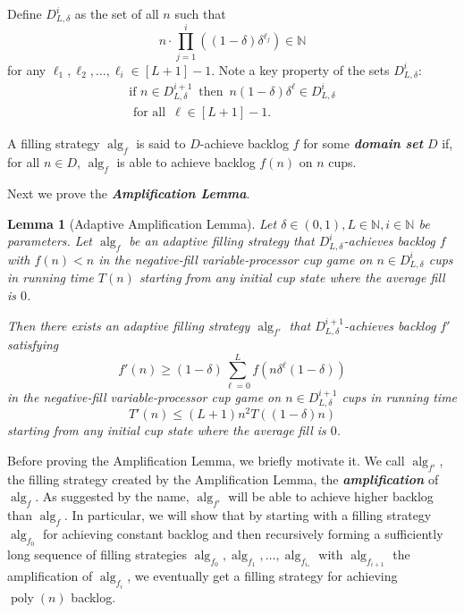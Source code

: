 \documentclass[twocolumn]{article}[10pt]
\newcommand{\defn}[1]{{\textit{\textbf{\boldmath #1}}}\xspace}
\DeclareMathOperator{\poly}{\text{poly}}
\DeclareMathOperator{\alg}{\text{alg}}
\newtheorem{lemma}{Lemma}
\begin{document}
Define $D_{L, \delta}^i$ as the set of all
$n$ such that 
$$n\cdot \prod_{j=1}^i \left((1-\delta)\delta^{\ell_j}\right)
\in \mathbb{N}$$ 
for any $\ell_1,\ell_2, \ldots, \ell_i \in [L+1]-1$.
Note a key property of the sets $D_{L, \delta}^i$: 
\begin{align}
  \text{if }n \in D_{L, \delta}^{i+1}\, \text{ then } \,
  n(1-\delta)\delta^\ell \in D_{L, \delta}^i
  \label{eqn:deltaIplus1toI}\\
  \text{ for all }\, \ell \in [L+1]-1 \nonumber.
\end{align}

A filling strategy $\alg_f$ is said to $D$-achieve backlog
$f$ for some \defn{domain set} $D$ if, for all $n \in D$,
$\alg_f$ is able to achieve backlog $f(n)$ on $n$ cups.

Next we prove the \defn{Amplification Lemma}.
\begin{lemma}[Adaptive Amplification Lemma]\label{lem:adaptiveAmplification}
  Let $\delta\in(0,1), L\in \mathbb{N}, i\in\mathbb{N}$ be parameters.
  Let $\alg_f$ be an adaptive filling strategy that 
  $D_{L, \delta}^i$-achieves backlog
  $f$ with $f(n) < n$ in the negative-fill variable-processor cup game
  on $n\in D_{L,\delta}^i$ cups in running time $T(n)$ starting from any initial
  cup state where the average fill is $0$.

  Then there exists an adaptive filling strategy $\alg_{f'}$ that $D_{L,
  \delta}^{i+1}$-achieves backlog $f'$ satisfying 
  $$f'(n) \ge (1-\delta)\sum_{\ell= 0}^{L} f(n\delta^\ell(1-\delta))$$
  in the negative-fill variable-processor cup game on $n \in
  D_{L, \delta}^{i+1}$ cups in running time 
  $$T'(n) \le (L+1)n^2 T((1-\delta)n)$$
  starting from any initial cup state where the average fill is $0$.
\end{lemma}

Before proving the Amplification Lemma, we briefly motivate it. 
We call $\alg_{f'}$, the filling strategy created by the Amplification
Lemma, the \defn{amplification} of $\alg_f$.
As suggested by the name, $\alg_{f'}$ will be able to achieve
higher backlog than $\alg_f$. In particular, we
will show that by starting with a filling strategy $\alg_{f_0}$ for achieving
constant backlog and then recursively forming a sufficiently
long sequence of filling strategies $\alg_{f_0}, \alg_{f_1},
\ldots, \alg_{f_{i_*}}$ with
$\alg_{f_{i+1}}$ the amplification of $\alg_{f_i}$, we eventually
get a filling strategy for achieving $\poly(n)$ backlog.
  
\end{document}
